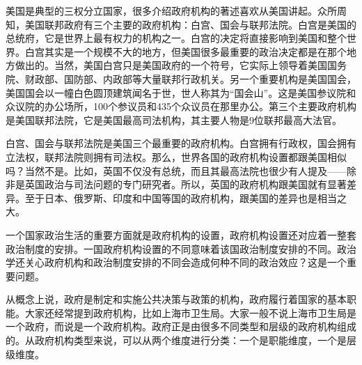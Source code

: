 





美国是典型的三权分立国家，很多介绍政府机构的著述喜欢从美国讲起。众所周知，美国联邦政府有三个主要的政府机构：白宫、国会与联邦法院。白宫是美国的总统府，它是世界上最有权力的机构之一。白宫的决定将直接影响到美国和整个世界。白宫其实是一个规模不大的地方，但美国很多最重要的政治决定都是在那个地方做出的。当然，美国白宫只是美国政府的一个符号，它实际上领导着美国国务院、财政部、国防部、内政部等大量联邦行政机关。另一个重要机构是美国国会，美国国会以一幢白色圆顶建筑闻名于世，世人称其为“国会山”。这是美国参议院和众议院的办公场所，100个参议员和435个众议员在那里办公。第三个主要政府机构是美国联邦法院，它是美国最高司法机构，其主要人物是9位联邦最高大法官。

白宫、国会与联邦法院是美国三个最重要的政府机构。白宫拥有行政权，国会拥有立法权，联邦法院则拥有司法权。那么，世界各国的政府机构设置都跟美国相似吗？当然不是。比如，英国不仅没有总统，而且其最高法院也很少有人提及——除非是英国政治与司法问题的专门研究者。所以，英国的政府机构跟美国就有显著差异。至于日本、俄罗斯、印度和中国等国的政府机构，跟美国的差异也是相当之大。

一个国家政治生活的重要方面就是政府机构的设置，政府机构设置还对应着一整套政治制度的安排。一国政府机构设置的不同意味着该国政治制度安排的不同。政治学还关心政府机构和政治制度安排的不同会造成何种不同的政治效应？这是一个重要问题。

从概念上说，政府是制定和实施公共决策与政策的机构，政府履行着国家的基本职能。大家还经常提到政府机构，比如上海市卫生局。大家一般不说上海市卫生局是一个政府，而说是一个政府机构。政府正是由很多不同类型和层级的政府机构组成的。从政府机构类型来说，可以从两个维度进行分类：一个是职能维度，一个是层级维度。

